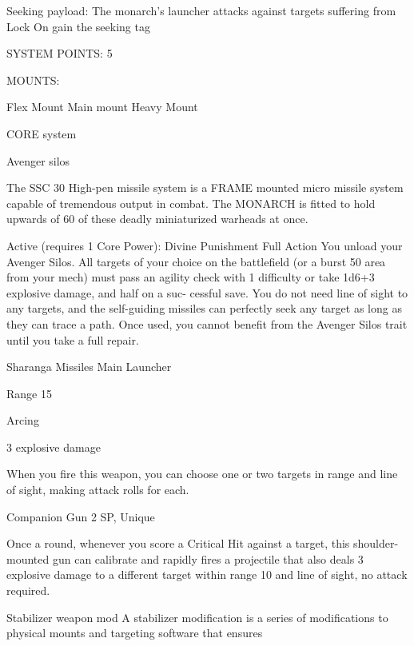   Seeking payload: The monarch’s launcher attacks against targets suffering from Lock On gain the  
  seeking tag 

                                               SYSTEM POINTS: 5 

                                                     MOUNTS: 

   Flex Mount                         Main mount                             Heavy Mount 

                                                   CORE system 

                                                   Avenger silos 

  The SSC 30 High-pen missile system is a FRAME mounted micro missile system capable of tremendous 
  output in combat. The MONARCH is fitted to hold upwards of 60 of these deadly miniaturized warheads 
  at once. 

  Active (requires 1 Core Power): Divine Punishment 
   Full Action 
  You unload your Avenger Silos. All targets of your choice on the battlefield (or a burst 50 area from your 
  mech) must pass an agility check with 1 difficulty or take 1d6+3 explosive damage, and half on a suc- 
  cessful save. You do not need line of sight to any targets, and the self-guiding missiles can perfectly 
  seek any target as long as they can trace a path. Once used, you cannot benefit from the Avenger Silos  
  trait until you take a full repair. 

                                                                                                                 


Sharanga Missiles  
Main Launcher
 
Range 15
 
Arcing
 
3 explosive damage
 
When you fire this weapon, you can choose one or two targets in range and line of sight, making  
attack rolls for each.
 

Companion Gun  
2 SP, Unique
 
Once a round, whenever you score a Critical Hit against a target, this shoulder-mounted gun can  
calibrate and rapidly fires a projectile that also deals 3 explosive damage to a different target  
within range 10 and line of sight, no attack required.
 

Stabilizer weapon mod  
A stabilizer modification is a series of modifications to physical mounts and targeting software that ensures  

